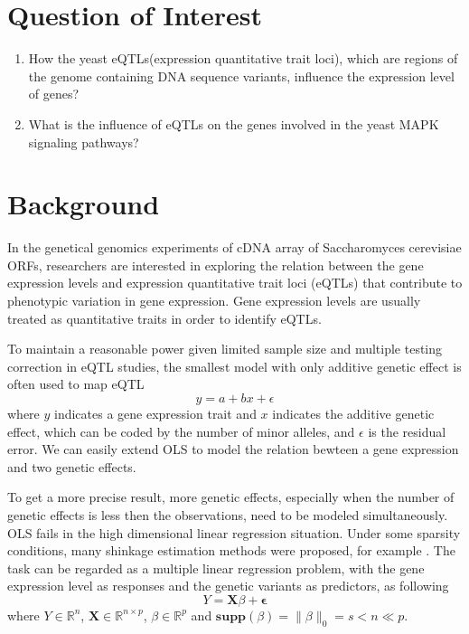 \section{Question of Interest}

\begin{enumerate}
    \renewcommand{\labelenumi}{(\theenumi)}
    \item How the yeast eQTLs(expression quantitative trait loci), which are regions of the genome containing DNA sequence variants, influence the expression level of genes? 
    \item What is the influence of eQTLs on the genes involved in the yeast MAPK signaling pathways?
\end{enumerate}


\section{Background}
\label{sec:review}

In the genetical genomics experiments of cDNA array of Saccharomyces cerevisiae ORFs, researchers are interested in exploring the relation between the gene expression levels and expression quantitative trait loci (eQTLs) that contribute to phenotypic variation in gene expression. Gene expression levels are usually treated as quantitative traits in order to identify eQTLs.

To maintain a reasonable power given limited sample size and multiple testing correction in eQTL studies, the smallest model with only additive genetic effect is often used to map eQTL \citep{stranger2007population} 
\begin{equation*}
    y = a + b x + \epsilon
\end{equation*}
where $y$ indicates a gene expression trait and $x$ indicates the additive genetic effect, which can be coded by the number of minor alleles, and $\epsilon$ is the residual error.
We can easily extend OLS to model the relation bewteen a gene expression and two genetic effects.

To get a more precise result, more genetic effects, especially when the number of genetic effects is less then the observations, need to be modeled simultaneously. OLS fails in the high dimensional linear regression situation. 
Under some sparsity conditions, many shinkage estimation methods were proposed, for example \cite{tibshirani1996regression,zou2005regularization,fan2001variable}. 
The task can be regarded as a multiple linear regression problem, with the gene expression level as responses and the genetic variants as predictors, as following
\begin{equation}\label{eq:single y}
    Y = \mathbf{X} \beta + \mathbf{\epsilon}
\end{equation}
where $Y\in\mathbb{R}^n$, $\mathbf{X}\in\mathbb{R}^{n\times p}$, $\beta\in\mathbb{R}^p$ and $\textbf{supp}(\beta) = \|\beta\|_0 = s < n \ll p$. 

